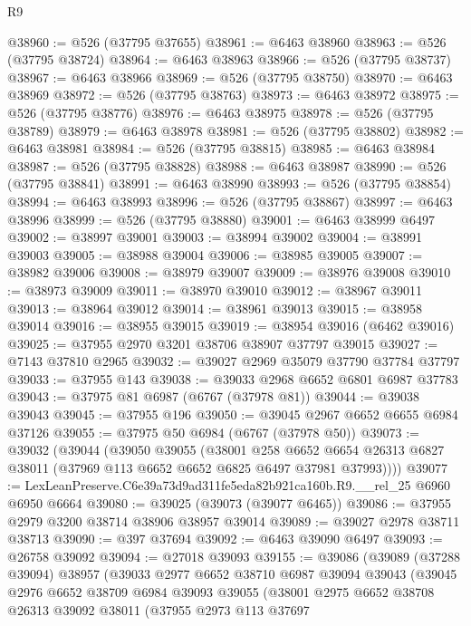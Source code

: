 \begin{lexlean}{R9}
\begin{coremodule}
@38960 := @526 (@37795 @37655)
@38961 := @6463 @38960
@38963 := @526 (@37795 @38724)
@38964 := @6463 @38963
@38966 := @526 (@37795 @38737)
@38967 := @6463 @38966
@38969 := @526 (@37795 @38750)
@38970 := @6463 @38969
@38972 := @526 (@37795 @38763)
@38973 := @6463 @38972
@38975 := @526 (@37795 @38776)
@38976 := @6463 @38975
@38978 := @526 (@37795 @38789)
@38979 := @6463 @38978
@38981 := @526 (@37795 @38802)
@38982 := @6463 @38981
@38984 := @526 (@37795 @38815)
@38985 := @6463 @38984
@38987 := @526 (@37795 @38828)
@38988 := @6463 @38987
@38990 := @526 (@37795 @38841)
@38991 := @6463 @38990
@38993 := @526 (@37795 @38854)
@38994 := @6463 @38993
@38996 := @526 (@37795 @38867)
@38997 := @6463 @38996
@38999 := @526 (@37795 @38880)
@39001 := @6463 @38999 @6497
@39002 := @38997 @39001
@39003 := @38994 @39002
@39004 := @38991 @39003
@39005 := @38988 @39004
@39006 := @38985 @39005
@39007 := @38982 @39006
@39008 := @38979 @39007
@39009 := @38976 @39008
@39010 := @38973 @39009
@39011 := @38970 @39010
@39012 := @38967 @39011
@39013 := @38964 @39012
@39014 := @38961 @39013
@39015 := @38958 @39014
@39016 := @38955 @39015
@39019 := @38954 @39016 (@6462 @39016)
@39025 := @37955 @2970 @3201 @38706 @38907 @37797 @39015
@39027 := @7143 @37810 @2965
@39032 := @39027 @2969 @35079 @37790 @37784 @37797
@39033 := @37955 @143
@39038 := @39033 @2968 @6652 @6801 @6987 @37783
@39043 := @37975 @81 @6987 (@6767 (@37978 @81))
@39044 := @39038 @39043
@39045 := @37955 @196
@39050 := @39045 @2967 @6652 @6655 @6984 @37126
@39055 := @37975 @50 @6984 (@6767 (@37978 @50))
@39073 := @39032
    (@39044
      (@39050
        @39055
        (@38001
          @258
          @6652
          @6654
          @26313
          @6827
          @38011
          (@37969 @113 @6652 @6652 @6825 @6497 @37981 @37993))))
@39077 := LexLeanPreserve.C6e39a73d9ad311fe5eda82b921ca160b.R9.__rel_25 @6960 @6950 @6664
@39080 := @39025 (@39073 (@39077 @6465))
@39086 := @37955 @2979 @3200 @38714 @38906 @38957 @39014
@39089 := @39027 @2978 @38711 @38713
@39090 := @397 @37694
@39092 := @6463 @39090 @6497
@39093 := @26758 @39092
@39094 := @27018 @39093
@39155 := @39086
    (@39089
      (@37288 @39094)
      @38957
      (@39033
        @2977
        @6652
        @38710
        @6987
        @39094
        @39043
        (@39045
          @2976
          @6652
          @38709
          @6984
          @39093
          @39055
          (@38001
            @2975
            @6652
            @38708
            @26313
            @39092
            @38011
            (@37955
              @2973
              @113
              @37697

\end{coremodule}
\end{lexlean}
